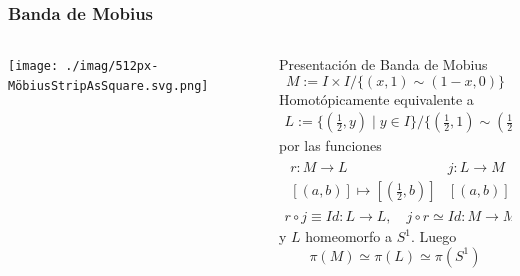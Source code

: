 \documentclass[xetex,mathserif,serif]{beamer}
\begin{document}
  \begin{frame}
    \frametitle{Banda de Mobius}
    \begin{columns}
      \begin{column}{0.3\textwidth}
        \begin{center}
          \texttt{[image: ./imag/512px-MöbiusStripAsSquare.svg.png]}
        \end{center}
      \end{column}
      \begin{column}{0.7\textwidth}
        Presentación de Banda de Mobius
        \[ M := I \times I / \{(x,1) \sim (1 - x, 0)\}\]
        \pause
        Homotópicamente equivalente a
        \begin{gather*}
          L := \{ \left(\frac 1 2, y \right) \mid y \in I \} / \{ \left(
                \frac 1 2 , 1 \right) \sim \left( \frac 1 2, 0 \right)\}
        \end{gather*}
        por las funciones
        \begin{gather*}
          \begin{matrix}
            r : M \to L & j : L \to M \\
            [(a,b)] \mapsto [(\frac 1 2 , b)] & [(a,b)] \mapsto [(a,b)]
          \end{matrix} \\
          r \circ j \equiv Id : L \to L, \quad j \circ r \simeq Id : M \to M
        \end{gather*}
      y \(L\) homeomorfo a \(S^1\). Luego
      \[ \pi (M) \simeq \pi (L) \simeq \pi (S^1) \]
      \end{column}
    \end{columns}
  \end{frame}
\end{document}

